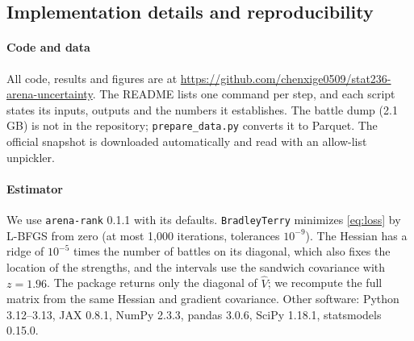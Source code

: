 \documentclass[12pt]{article}
\begin{document}
\FloatBarrier
\subsection{Implementation details and reproducibility}\label{app:impl}

\paragraph{Code and data} All code, results and figures are at \url{https://github.com/chenxige0509/stat236-arena-uncertainty}. The README lists one command per step, and each script states its inputs, outputs and the numbers it establishes. The battle dump (2.1 GB) is not in the repository; \texttt{prepare\_data.py} converts it to Parquet. The official snapshot is downloaded automatically and read with an allow-list unpickler.

\paragraph{Estimator} We use \texttt{arena-rank} 0.1.1 with its defaults. \texttt{BradleyTerry} minimizes \eqref{eq:loss} by \mbox{L-BFGS} from zero (at most 1,000 iterations, tolerances $10^{-9}$). The Hessian has a ridge of $10^{-5}$ times the number of battles on its diagonal, which also fixes the location of the strengths, and the intervals use the sandwich covariance with $z = 1.96$. The package returns only the diagonal of $\hat V$; we recompute the full matrix from the same Hessian and gradient covariance. Other software: Python 3.12--3.13, JAX 0.8.1, NumPy 2.3.3, pandas 3.0.6, SciPy 1.18.1, statsmodels 0.15.0.
\end{document}
